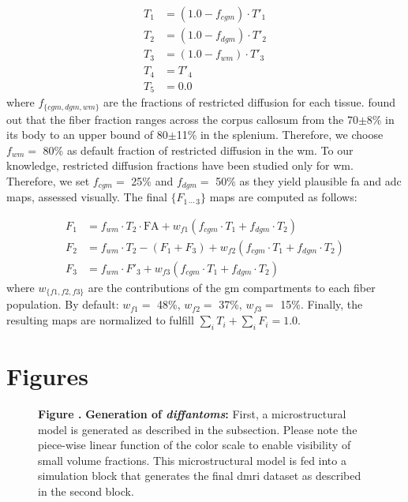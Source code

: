 \documentclass[english]{frontiers/frontiersSCNS} %
\begin{document}
  \begin{align*}
  T_1 &= (1.0-f_{cgm}) \cdot T'_1 \\
  T_2 &= (1.0-f_{dgm}) \cdot T'_2 \\
  T_3 &= (1.0-f_{wm}) \cdot T'_3 \\
  T_4 &= T'_4 \\
  T_5 &= 0.0
  \end{align*}
where $f_{\{cgm, dgm, wm\}}$ are the fractions of restricted diffusion for each tissue.
\cite{sepehrband_brain_2015} found out that the fiber fraction ranges across the corpus
  callosum from the 70$\pm$8\% in its body to an upper bound of 80$\pm$11\% in the splenium.
Therefore, we choose $f_{wm} =$ 80\% as default fraction of restricted diffusion in the
  \gls*{wm}.
To our knowledge, restricted diffusion fractions have been studied only for \gls*{wm}.
Therefore, we set $f_{cgm} =$ 25\% and $f_{dgm} =$ 50\% as they yield plausible \gls*{fa}
  and \gls*{adc} maps, assessed visually.
The final $\{F_{1\,\cdots\,3}\}$ maps are computed as follows:

\begin{align*}
F_1 &= f_{wm} \cdot T_2 \cdot \text{FA} + w_{f1} (f_{cgm} \cdot T_1 + f_{dgm} \cdot T_2) \\
F_2 &= f_{wm} \cdot T_2 - (F_1 + F_3) + w_{f2} (f_{cgm} \cdot T_1 + f_{dgm} \cdot T_2) \\
F_3 &= f_{wm} \cdot F'_3 + w_{f3} (f_{cgm} \cdot T_1 + f_{dgm} \cdot T_2)
\end{align*}
where $w_{\{f1, f2, f3\}}$ are the contributions of the \gls*{gm} compartments to each fiber population.
By default: $w_{f1} = $ 48\%, $w_{f2} = $ 37\%, $w_{f3} = $ 15\%.
Finally, the resulting maps are normalized to fulfill $\sum_i T_i + \sum_i F_i = 1.0$.

\newpage
\section*{Figures}

\begin{figure}[h!]
\begin{center}

\end{center}
\textbf{\label{fig:figure1} Figure . }%
{\textbf{Generation of \emph{diffantoms}:} First, a microstructural model is generated as described
  in the  subsection.
Please note the piece-wise linear function of the color scale to enable visibility of small volume fractions.
This microstructural model is fed into a simulation block that generates the final \gls*{dmri} dataset
  as described in the second block.
}
\end{figure}
\end{document}
